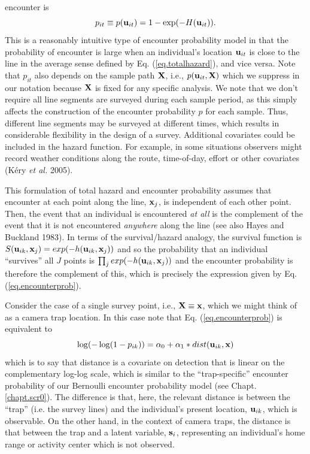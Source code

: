 encounter is
\begin{equation}
p_{it} \equiv p({\bf u}_{it}) = 1- \exp(-H({\bf u}_{it})).
\label{eq.encounterprob}
\end{equation}
This is a reasonably intuitive type of encounter probability model in
that the probability of encounter is large when an individual's
location ${\bf u}_{it}$ is close to the line in the average sense
defined by Eq. (\ref{eq.totalhazard}), and vice versa. Note that
$p_{it}$ also depends on the sample path ${\bf X}$, i.e., $p({\bf
  u}_{it}, {\bf X})$ which we suppress in our notation because ${\bf
  X}$ is fixed for any specific analysis.  We note that we don't
require all line segments are surveyed during each sample period, as
this simply affects the construction of the encounter probability $p$
for each sample. Thus, different line segments may be surveyed at
different times, which results in considerable flexibility in the
design of a survey. Additional covariates could be included in the
hazard function. For example, in some situations observers might
record weather conditions along the route, time-of-day, effort or
other covariates (K\'{e}ry {\it et al.} 2005).

This formulation of total hazard and encounter probability assumes
that encounter at each point along the line, ${\bf x}_{j}$, is
independent of each other point. Then, the event that an individual is
encountered {\it at all} is the complement of the event that it is not
encountered {\it anywhere} along the line (see also Hayes and Buckland
1983).  In terms of the survival/hazard analogy, the survival function
is $S({\bf u}_{ik},{\bf x}_{j}) = exp(-h({\bf u}_{ik},{\bf x}_{j}))$
and so the probability that an individual ``survives'' all $J$ points
is $\prod_{j} exp(-h({\bf u}_{ik},{\bf x}_{j}))$ and the encounter
probability is therefore the complement of this, which is precisely
the expression given by Eq. (\ref{eq.encounterprob}).

Consider the case of a single survey point, i.e., ${\bf X} \equiv {\bf
  x}$, which we might think of as a camera trap location.  In this
case note that Eq. (\ref{eq.encounterprob}) is equivalent to
\[
\log(-\log(1-p_{ik})) = \alpha_{0} + \alpha_{1}*dist( {\bf u}_{ik},{\bf x})
\]
which is to say that distance is a covariate on detection that is
linear on the complementary log-log scale, which is similar to the
``trap-specific'' encounter probability of our Bernoulli encounter
probability model (see Chapt. \ref{chapt.scr0}).
The difference is that, here, the relevant distance
is between the ``trap'' (i.e. the survey lines) and the individual's
present location, ${\bf u}_{ik}$, which is observable. On the other
hand, in the context of camera traps, the distance is that between the
trap and a latent variable, ${\bf s}_{i}$, representing an
individual's home range or activity center which is not observed.


